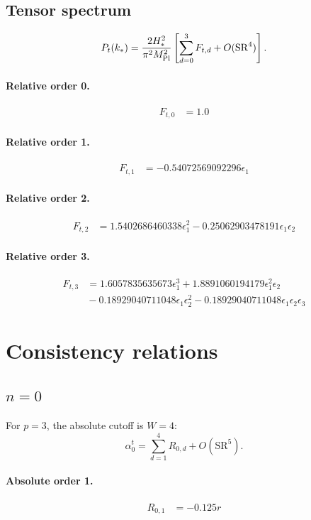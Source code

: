 \documentclass[10pt]{article}
\begin{document}
\subsection{Tensor spectrum}
\[P_t(k_*)=\frac{2H_*^2}{\pi^2M_{\rm Pl}^2}\left[\sum_{d=0}^{3}F_{t,d}+O(\mathrm{SR}^{4})\right].\]
\paragraph{Relative order 0.}
\begin{align*}
F_{t,0} &= 1.0
\end{align*}

\paragraph{Relative order 1.}
\begin{align*}
F_{t,1} &=  - 0.54072569092296 \epsilon_{1}
\end{align*}

\paragraph{Relative order 2.}
\begin{align*}
F_{t,2} &= 1.5402686460338 \epsilon_{1}^{2} - 0.25062903478191 \epsilon_{1} \epsilon_{2}
\end{align*}

\paragraph{Relative order 3.}
\begin{align*}
F_{t,3} &= 1.6057835635673 \epsilon_{1}^{3} + 1.8891060194179 \epsilon_{1}^{2} \epsilon_{2} \\
&{}  - 0.18929040711048 \epsilon_{1} \epsilon_{2}^{2} - 0.18929040711048 \epsilon_{1} \epsilon_{2} \epsilon_{3}
\end{align*}

\section{Consistency relations}
\subsection{$n=0$}
For $p=3$, the absolute cutoff is $W=4$:
\[\alpha_{0}^t=\sum_{d=1}^{4}R_{0,d}+O(\mathrm{SR}^{5}).\]
\paragraph{Absolute order 1.}
\begin{align*}
R_{0,1} &=  - 0.125 r
\end{align*}
\end{document}
